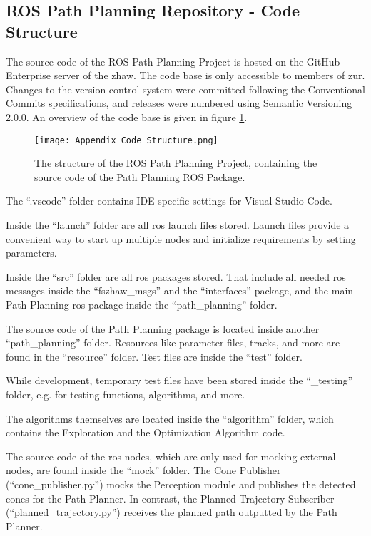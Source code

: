 \subsection{ROS Path Planning Repository - Code Structure} \label{sec:Appendix Code Structure}
The source code of the ROS Path Planning Project is hosted on the GitHub Enterprise server of the \acrshort{zhaw}. \cite{ros_path_planning_github}
The code base is only accessible to members of \acrlong{zur}. Changes to the version control system were committed following the Conventional Commits specifications, and releases were numbered using Semantic Versioning 2.0.0. \cite{conventional_commits} \cite{semantic_versioning}
An overview of the code base is given in figure \ref{fig:Appendix Code Structure}.
\begin{figure}[H]
    \centering
    \texttt{[image: Appendix\_Code\_Structure.png]}
    \caption{The structure of the ROS Path Planning Project, containing the source code of the Path Planning ROS Package.}
    \label{fig:Appendix Code Structure}
\end{figure}
The ``.vscode'' folder contains IDE-specific settings for Visual Studio Code. \cite{vscode_user_and_workspace_settings}

Inside the ``launch'' folder are all \acrshort{ros} launch files stored. Launch files provide a convenient way to start up multiple nodes and initialize requirements by setting parameters. \cite{clearpath_robotics_launch_files}

Inside the ``src'' folder are all \acrshort{ros} packages stored. That include all needed \acrshort{ros} messages inside the ``fszhaw\_msgs'' and the ``interfaces'' package, and the main Path Planning \acrshort{ros} package inside the ``path\_planning'' folder.

The source code of the Path Planning package is located inside another ``path\_planning'' folder. Resources like parameter files, tracks, and more are found in the ``resource'' folder. Test files are inside the ``test'' folder.

While development, temporary test files have been stored inside the ``\_testing'' folder, e.g. for testing functions, algorithms, and more.

The algorithms themselves are located inside the ``algorithm'' folder, which contains the Exploration and the Optimization Algorithm code.

The source code of the \acrshort{ros} nodes, which are only used for mocking external nodes, are found inside the ``mock'' folder. The Cone Publisher (``cone\_publisher.py'') mocks the Perception module and publishes the detected cones for the Path Planner. In contrast, the Planned Trajectory Subscriber (``planned\_trajectory.py'') receives the planned path outputted by the Path Planner.


